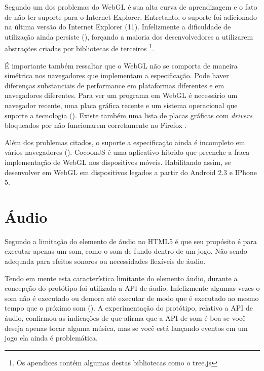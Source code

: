 Segundo \citet{html5mostwanted} um dos problemas do WebGL é sua alta
curva de aprendizagem e o fato de não ter suporte para o Internet
Explorer. Entretanto, o suporte foi adicionado na última versão do
Internet Explorer (11). Infelizmente a dificuldade de utilização
ainda persiste (), forçando a maioria dos
desenvolvedores a utilizarem abstrações criadas por bibliotecas de
terceiros \footnote{Os apendices contém algumas destas bibliotecas como
o tree.js}.

É importante também ressaltar que o WebGL não se comporta de
maneira simétrica nos navegadores que implementam a especificação.
Pode haver diferenças substanciais de performance em plataformas
diferentes e em navegadores diferentes. Para ver um programa em WebGL
é necessário um navegador recente, uma placa gráfica recente e um
sistema operacional que suporte a tecnologia \textsc{\autocite{html5mostwanted}}
(). Existe também uma lista de
placas gráficas com \textit{drivers} bloqueados por não funcionarem
corretamente no Firefox \textsc{\autocite[p.42]{3daps}}.

Além dos problemas citados, o suporte a especificação ainda é
incompleto em vários navegadores ().
CocoonJS é uma aplicativo híbrido que preenche a fraca implementação
de WebGL nos dispositivos móveis. Habilitando assim, se desenvolver em WebGL
em dispositivos legados a partir do Android 2.3 e IPhone 5.

\section{Áudio}

Segundo \citet{html5mostwanted} a limitação do elemento de áudio no
HTML5 é que seu propósito é para executar apenas um som, como o som
de fundo dentro de um jogo. Não sendo adequada para efeitos sonoros
ou necessidades flexíveis de áudio.

Tendo em mente esta característica limitante do elemento áudio,
durante a concepção do protótipo foi utilizada a API de áudio.
Infelizmente algumas vezes o som não é executado ou demora até
executar de modo que é executado ao mesmo tempo que o próximo
som (). A experimentação do
protótipo, relativo a API de áudio, confirmou as indicações de
\citet{html5mostwanted} que afirma que a API de som é boa se você
deseja apenas tocar alguma música, mas se você está lançando eventos
em um jogo ela ainda é problemática.

